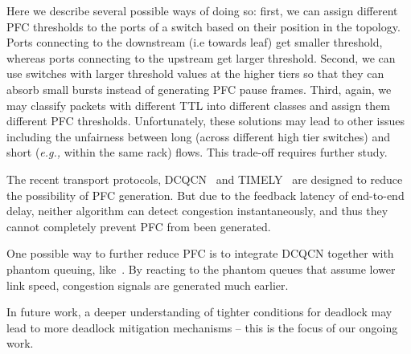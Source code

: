 Here we describe several possible ways of doing so: first, we can assign
different PFC thresholds to the ports of a switch based on their position in the
topology. Ports connecting to the downstream (i.e towards leaf) get smaller
threshold, whereas ports connecting to the upstream get larger threshold.
Second, we can use switches with larger threshold values at the higher tiers so
that they can absorb small bursts instead of generating PFC pause frames. Third,
again, we may classify packets with different TTL into different classes and
assign them different PFC thresholds.  Unfortunately, these solutions may lead
to other issues including the unfairness between long (across different high
tier switches) and short ({\em e.g.,} within the same rack) flows.  This
trade-off requires further study.

 The recent transport protocols,
DCQCN~\cite{dcqcn} and TIMELY~\cite{timely} are designed to reduce the
possibility of PFC generation. But due to the feedback latency of end-to-end
delay, neither algorithm can detect congestion instantaneously, and thus they
cannot completely prevent PFC from been generated.

One possible way to further reduce PFC is to integrate DCQCN together with
phantom queuing, like~\cite{Alizadeh12}. By reacting to the phantom queues that
assume lower link speed, congestion signals are generated much earlier.

 In future work, a deeper understanding of
tighter conditions for deadlock may lead to more deadlock mitigation mechanisms
-- this is the focus of our ongoing work.

